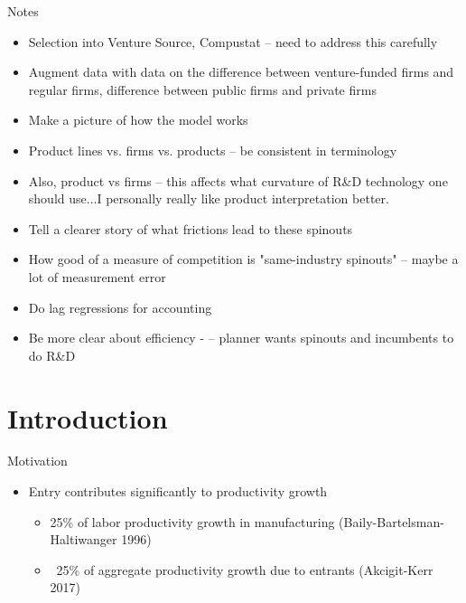 \documentclass[english,usenames,dvipsnames]{beamer}
\begin{document}
\begin{frame}{Notes}
\begin{itemize}
	\item Selection into Venture Source, Compustat -- need to address this carefully
	\item Augment data with data on the difference between venture-funded firms and regular firms, difference between public firms and private firms
	\item Make a picture of how the model works
	\item Product lines vs. firms vs. products -- be consistent in terminology
	\item Also, product vs firms -- this affects what curvature of R\&D technology one should use...I personally really like product interpretation better.
	\item Tell a clearer story of what frictions lead to these spinouts
	\item How good of a measure of competition is "same-industry spinouts" -- maybe a lot of measurement error
	\item Do lag regressions for accounting
	\item Be more clear about efficiency - -- planner wants spinouts and incumbents to do R\&D
\end{itemize}
\end{frame}



\section{Introduction}

\begin{frame}{Motivation}
\begin{itemize}
	\item Entry contributes significantly to productivity growth
	\begin{itemize}
		\item 25\% of labor productivity growth in manufacturing (Baily-Bartelsman-Haltiwanger 1996)
		\item ~25\% of aggregate productivity growth due to entrants (Akcigit-Kerr 2017)
	\end{itemize}
\end{itemize}
\end{frame}
\end{document}
